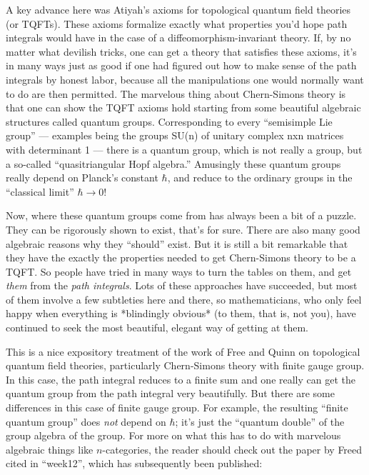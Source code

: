 \documentclass{article}
\def\tightlist{}
\renewcommand{\texttt}[1]{%
  \begingroup
  \ttfamily
  \begingroup\lccode`~=`/\lowercase{\endgroup\def~}{/\discretionary{}{}{}}%
  \begingroup\lccode`~=`[\lowercase{\endgroup\def~}{[\discretionary{}{}{}}%
  \begingroup\lccode`~=`.\lowercase{\endgroup\def~}{.\discretionary{}{}{}}%
  \catcode`/=\active\catcode`[=\active\catcode`.=\active
  \scantokens{#1\noexpand}%
  \endgroup
}
\begin{document}
A key advance here was Atiyah's axioms for topological quantum field
theories (or TQFTs). These axioms formalize exactly what properties
you'd hope path integrals would have in the case of a
diffeomorphism-invariant theory. If, by no matter what devilish tricks,
one can get a theory that satisfies these axioms, it's in many ways just
as good if one had figured out how to make sense of the path integrals
by honest labor, because all the manipulations one would normally want
to do are then permitted. The marvelous thing about Chern-Simons theory
is that one can show the TQFT axioms hold starting from some beautiful
algebraic structures called quantum groups. Corresponding to every
``semisimple Lie group'' --- examples being the groups SU(n) of unitary
complex nxn matrices with determinant 1 --- there is a quantum group,
which is not really a group, but a so-called ``quasitriangular Hopf
algebra.'' Amusingly these quantum groups really depend on Planck's
constant \(\hbar\), and reduce to the ordinary groups in the ``classical
limit'' \(\hbar \to 0\)!

Now, where these quantum groups come from has always been a bit of a
puzzle. They can be rigorously shown to exist, that's for sure. There
are also many good algebraic reasons why they ``should'' exist. But it
is still a bit remarkable that they have the exactly the properties
needed to get Chern-Simons theory to be a TQFT. So people have tried in
many ways to turn the tables on them, and get \emph{them} from the
\emph{path integrals}. Lots of these approaches have succeeded, but most
of them involve a few subtleties here and there, so mathematicians, who
only feel happy when everything is *blindingly obvious* (to them, that
is, not you), have continued to seek the most beautiful, elegant way of
getting at them.


This is a nice expository treatment of the work of Free and Quinn on
topological quantum field theories, particularly Chern-Simons theory
with finite gauge group. In this case, the path integral reduces to a
finite sum and one really can get the quantum group from the path
integral very beautifully. But there are some differences in this case
of finite gauge group. For example, the resulting ``finite quantum
group'' does \emph{not} depend on \(\hbar\); it's just the ``quantum
double'' of the group algebra of the group. For more on what this has to
do with marvelous algebraic things like \(n\)-categories, the reader
should check out the paper by Freed cited in ``week12'', which has
subsequently been published:
\end{document}
